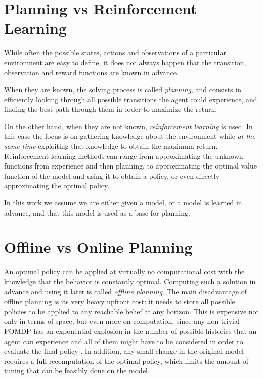 \section{Planning vs Reinforcement Learning}\label{ref:solutions}

While often the possible states, actions and observations of a particular environment are easy to
define, it does not always happen that the transition, observation and reward functions are known in
advance.

When they are known, the solving process is called \textit{planning}, and consists in efficiently
looking through all possible transitions the agent could experience, and finding the best path
through them in order to maximize the return.

On the other hand, when they are not known, \textit{reinforcement learning} is used. In this case the
focus is on gathering knowledge about the environment while \textit{at the same time} exploiting that
knowledge to obtain the maximum return. Reinforcement learning methods can range from approximating
the unknown functions from experience and then planning, to approximating the optimal value function
of the model and using it to obtain a policy, or even directly approximating the optimal policy.

In this work we assume we are either given a model, or a model is learned in advance, and that this
model is used as a base for planning.


\section{Offline vs Online Planning}

An optimal policy can be applied at virtually no computational cost with the knowledge that the
behavior is constantly optimal. Computing such a solution in advance and using it later is called
\textit{offline planning}. The main disadvantage of offline planning is its very heavy upfront cost:
it needs to store all possible policies to be applied to any reachable belief at any horizon. This
is expensive not only in terms of space, but even more on computation, since any non-trivial POMDP
has an exponential explosion in the number of possible histories that an agent can experience and
all of them might have to be considered in order to evaluate the final policy \cite{cit:pomdp}. In
addition, any small change in the original model requires a full recomputation of the optimal
policy, which limits the amount of tuning that can be feasibly done on the model.

